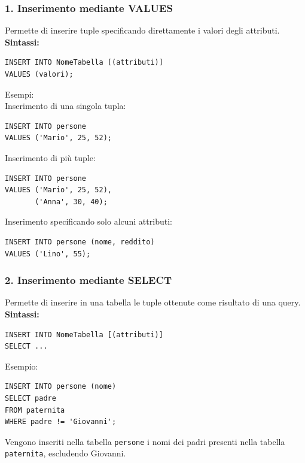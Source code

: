 \subsubsection*{1. Inserimento mediante VALUES}
Permette di inserire tuple specificando direttamente i valori degli attributi.\\
\textbf{Sintassi:}
\begin{verbatim}
INSERT INTO NomeTabella [(attributi)]
VALUES (valori);
\end{verbatim}
\textcolor{verdeEsempio}{Esempi:}\\
Inserimento di una singola tupla:
\begin{verbatim}
INSERT INTO persone
VALUES ('Mario', 25, 52);
\end{verbatim}
\noindent Inserimento di più tuple:
\begin{verbatim}
INSERT INTO persone
VALUES ('Mario', 25, 52),
       ('Anna', 30, 40);
\end{verbatim}
\noindent Inserimento specificando solo alcuni attributi:
\begin{verbatim}
INSERT INTO persone (nome, reddito)
VALUES ('Lino', 55);
\end{verbatim}
\subsubsection*{2. Inserimento mediante SELECT}
Permette di inserire in una tabella le tuple ottenute come risultato di una query.\\
\textbf{Sintassi:}
\begin{verbatim}
INSERT INTO NomeTabella [(attributi)]
SELECT ...
\end{verbatim}
\textcolor{verdeEsempio}{Esempio:}
\begin{verbatim}
INSERT INTO persone (nome)
SELECT padre
FROM paternita
WHERE padre != 'Giovanni';
\end{verbatim}
\noindent Vengono inseriti nella tabella \texttt{persone} i nomi dei padri presenti nella tabella \texttt{paternita}, escludendo Giovanni.
